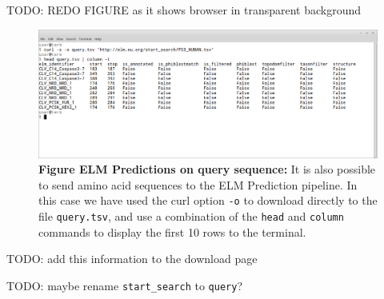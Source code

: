 
TODO: REDO FIGURE as it shows browser in transparent background

\begin{figure}[h!]
\centering
\includegraphics[width=\textwidth]{Figures/BACT_3/predictions_query.png} 
\caption{
\textbf{Figure ELM Predictions on query sequence:}
It is also possible to send amino
acid sequences to the ELM Prediction pipeline. In this case we have used
the curl option \texttt{-o} to download directly to the file
\texttt{query.tsv}, and use a combination of the \texttt{head} and
\texttt{column} commands to display the first 10 rows to the terminal.
}
\end{figure}

TODO: add this information to the download page

TODO: maybe rename \texttt{start\_search} to \texttt{query}?

